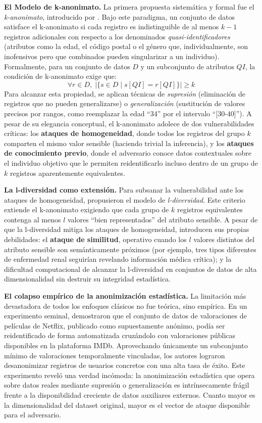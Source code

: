 \textbf{El Modelo de k-anonimato.} La primera propuesta sistemática y formal fue el \textit{k-anonimato}, introducido por \textcite{sweeney2002kanon}. Bajo este paradigma, un conjunto de datos satisface el k-anonimato si cada registro es indistinguible de al menos $k-1$ registros adicionales con respecto a los denominados \textit{quasi-identificadores} (atributos como la edad, el código postal o el género que, individualmente, son inofensivos pero que combinados pueden singularizar a un individuo). Formalmente, para un conjunto de datos $D$ y un subconjunto de atributos $QI$, la condición de k-anonimato exige que:
$$ \forall r \in D, \; |\{ s \in D \mid s[QI] = r[QI] \}| \geq k $$
Para alcanzar esta propiedad, se aplican técnicas de \textit{supresión} (eliminación de registros que no pueden generalizarse) o \textit{generalización} (sustitución de valores precisos por rangos, como reemplazar la edad ``34'' por el intervalo ``[30-40]''). A pesar de su elegancia conceptual, el k-anonimato adolece de dos vulnerabilidades críticas: los \textbf{ataques de homogeneidad}, donde todos los registros del grupo $k$ comparten el mismo valor sensible (haciendo trivial la inferencia), y los \textbf{ataques de conocimiento previo}, donde el adversario conoce datos contextuales sobre el individuo objetivo que le permiten reidentificarlo incluso dentro de un grupo de $k$ registros aparentemente equivalentes.

\textbf{La l-diversidad como extensión.} Para subsanar la vulnerabilidad ante los ataques de homogeneidad, \textcite{machanavajjhala2007ldiv} propusieron el modelo de \textit{l-diversidad}. Este criterio extiende el k-anonimato exigiendo que cada grupo de $k$ registros equivalentes contenga al menos $l$ valores ``bien representados'' del atributo sensible. A pesar de que la l-diversidad mitiga los ataques de homogeneidad, introducen sus propias debilidades: el \textbf{ataque de similitud}, operativo cuando los $l$ valores distintos del atributo sensible son semánticamente próximos (por ejemplo, tres tipos diferentes de enfermedad renal seguirían revelando información médica crítica); y la dificultad computacional de alcanzar la l-diversidad en conjuntos de datos de alta dimensionalidad sin destruir su integridad estadística.

\textbf{El colapso empírico de la anonimización estadística.} La limitación más devastadora de todos los enfoques clásicos no fue teórica, sino empírica. En un experimento seminal, \textcite{narayanan2008netflix} demostraron que el conjunto de datos de valoraciones de películas de Netflix, publicado como supuestamente anónimo, podía ser reidentificado de forma automatizada cruzándolo con valoraciones públicas disponibles en la plataforma IMDb. Aprovechando únicamente un subconjunto mínimo de valoraciones temporalmente vinculadas, los autores lograron desanonimizar registros de usuarios concretos con una alta tasa de éxito. Este experimento reveló una verdad incómoda: la anonimización estadística que opera sobre datos reales mediante supresión o generalización es intrínsecamente frágil frente a la disponibilidad creciente de datos auxiliares externos. Cuanto mayor es la dimensionalidad del dataset original, mayor es el vector de ataque disponible para el adversario.

